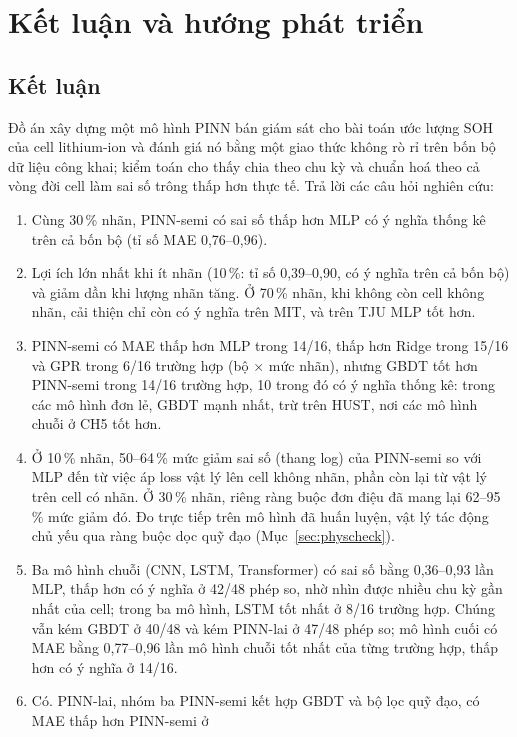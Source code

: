\documentclass[12pt,a4paper,oneside]{report}
\theoremstyle{plain}
\theoremstyle{definition}
\begin{document}
\chapter{Kết luận và hướng phát triển}\label{ch:ketluan}

\section{Kết luận}

Đồ án xây dựng một mô hình PINN bán giám sát cho bài toán ước lượng SOH của cell lithium-ion và đánh giá nó bằng
một giao thức không rò rỉ trên bốn bộ dữ liệu công khai; kiểm toán cho thấy chia theo chu kỳ và chuẩn hoá theo cả vòng
đời cell làm sai số trông thấp hơn thực tế. Trả lời các câu hỏi nghiên cứu:

\begin{enumerate}[label=\textbf{CH\arabic*.}]
\item Cùng 30\,\% nhãn, PINN-semi có sai số thấp hơn MLP có ý nghĩa thống kê trên cả bốn bộ (tỉ số MAE 0{,}76--0{,}96).
\item Lợi ích lớn nhất khi ít nhãn (10\,\%: tỉ số 0{,}39--0{,}90, có ý nghĩa trên cả bốn bộ) và giảm dần khi lượng nhãn tăng.
      Ở 70\,\% nhãn, khi không còn cell không nhãn, cải thiện chỉ còn có ý nghĩa trên MIT, và trên TJU MLP tốt hơn.
\item PINN-semi có MAE thấp hơn MLP trong 14/16, thấp hơn Ridge trong 15/16 và GPR trong 6/16 trường hợp (bộ × mức nhãn), nhưng GBDT tốt hơn PINN-semi trong 14/16 trường hợp, 10 trong đó có ý nghĩa thống kê: trong các mô hình đơn lẻ, GBDT mạnh nhất, trừ trên HUST, nơi các mô hình chuỗi ở CH5 tốt hơn.
\item Ở 10\,\% nhãn, 50--64\,\% mức giảm sai số (thang log) của PINN-semi so với MLP đến từ việc áp loss vật
      lý lên cell không nhãn, phần còn lại từ vật lý trên cell có nhãn. Ở 30\,\% nhãn, riêng ràng buộc đơn điệu đã
      mang lại 62--95\,\% mức giảm đó. Đo trực tiếp trên mô hình đã huấn luyện, vật lý tác động chủ yếu qua
      ràng buộc dọc quỹ đạo (Mục~\ref{sec:physcheck}).
\item Ba mô hình chuỗi (CNN, LSTM, Transformer) có sai số bằng 0{,}36--0{,}93 lần MLP, thấp hơn có ý nghĩa ở 42/48 phép so, nhờ nhìn được nhiều chu kỳ gần nhất của cell; trong ba mô hình, LSTM tốt nhất ở 8/16 trường hợp. Chúng vẫn kém GBDT ở 40/48 và kém PINN-lai ở 47/48 phép so; mô hình cuối có MAE bằng 0{,}77--0{,}96 lần mô hình chuỗi tốt nhất của từng trường hợp, thấp hơn có ý nghĩa ở 14/16.
\item Có. PINN-lai, nhóm ba PINN-semi kết hợp GBDT và bộ lọc quỹ đạo, có MAE thấp hơn PINN-semi ở

\end{enumerate}
\end{document}
